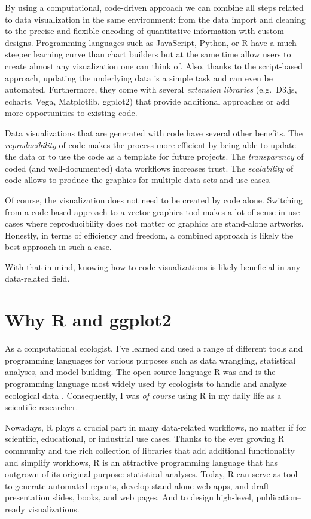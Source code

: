 \documentclass[
]{krantz}
\begin{document}
By using a computational, code-driven approach we can combine all steps related to data visualization in the same environment: from the data import and cleaning to the precise and flexible encoding of quantitative information with custom designs. Programming languages such as JavaScript, Python, or R have a much steeper learning curve than chart builders but at the same time allow users to create almost any visualization one can think of. Also, thanks to the script-based approach, updating the underlying data is a simple task and can even be automated. Furthermore, they come with several \emph{extension libraries} (e.g.~D3.js, echarts, Vega, Matplotlib, ggplot2) that provide additional approaches or add more opportunities to existing code.

Data visualizations that are generated with code have several other benefits. The \emph{reproducibility} of code makes the process more efficient by being able to update the data or to use the code as a template for future projects. The \emph{transparency} of coded (and well-documented) data workflows increases trust. The \emph{scalability} of code allows to produce the graphics for multiple data sets and use cases.

Of course, the visualization does not need to be created by code alone. Switching from a code-based approach to a vector-graphics tool makes a lot of sense in use cases where reproducibility does not matter or graphics are stand-alone artworks. Honestly, in terms of efficiency and freedom, a combined approach is likely the best approach in such a case.

With that in mind, knowing how to code visualizations is likely beneficial in any data-related field.

\hypertarget{why}{%
\section{\texorpdfstring{Why R and \textbf{ggplot2}}{Why R and ggplot2}}\label{why}}

As a computational ecologist, I've learned and used a range of different tools and programming languages for various purposes such as data wrangling, statistical analyses, and model building. The open-source language R was and is the programming language most widely used by ecologists to handle and analyze ecological data \citep{sciaini2018}. Consequently, I was \emph{of course} using R in my daily life as a scientific researcher.

Nowadays, R plays a crucial part in many data-related workflows, no matter if for scientific, educational, or industrial use cases. Thanks to the ever growing R community and the rich collection of libraries that add additional functionality and simplify workflows, R is an attractive programming language that has outgrown of its original purpose: statistical analyses. Today, R can serve as tool to generate automated reports, develop stand-alone web apps, and draft presentation slides, books, and web pages. And to design high-level, publication--ready visualizations.
\end{document}
